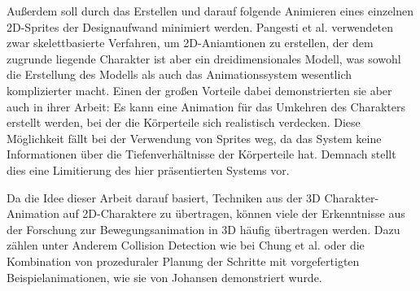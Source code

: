 Außerdem soll durch das Erstellen und darauf folgende Animieren eines einzelnen 2D-Sprites der Designaufwand minimiert werden. Pangesti et al. \cite{pangesti2019analysis} verwendeten zwar skelettbasierte Verfahren, um 2D-Aniamtionen zu erstellen, der dem zugrunde liegende Charakter ist aber ein dreidimensionales Modell, was sowohl die Erstellung des Modells als auch das Animationssystem wesentlich komplizierter macht. Einen der großen Vorteile dabei demonstrierten sie aber auch in ihrer Arbeit: Es kann eine Animation für das Umkehren des Charakters erstellt werden, bei der die Körperteile sich realistisch verdecken. Diese Möglichkeit fällt bei der Verwendung von Sprites weg, da das System keine Informationen über die Tiefenverhältnisse der Körperteile hat. Demnach stellt dies eine Limitierung des hier präsentierten Systems vor.

Da die Idee dieser Arbeit darauf basiert, Techniken aus der 3D Charakter-Animation auf 2D-Charaktere zu übertragen, können viele der Erkenntnisse aus der Forschung zur Bewegungsanimation in 3D häufig übertragen werden. Dazu zählen unter Anderem Collision Detection wie bei Chung et al. \cite{chung1999animation} oder die Kombination von prozeduraler Planung der Schritte mit vorgefertigten Beispielanimationen, wie sie von Johansen \cite{johansen2009automated} demonstriert wurde.